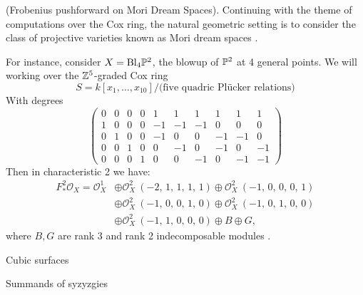 \documentclass{article}
\def\O{\mathcal O}
\numberwithin{equation}{section}
\theoremstyle{theorem}
\numberwithin{thm}{section}
\theoremstyle{definition}
\begin{document}
\begin{exa}(Frobenius pushforward on Mori Dream Spaces).
  Continuing with the theme of computations over the Cox ring, the natural geometric setting is to consider the class of projective varieties known as Mori dream spaces \cite{HuKeel00}.

  For instance, consider $X = \mathrm{Bl}_4\P^2$, the blowup of $\P^2$ at 4 general points. We will working over the $\Z^5$-graded Cox ring
  \[ S = k[x_1,\dots,x_{10}]/\text{(five quadric Pl\"ucker relations)} \]
  With degrees
    \[
    \left(\!\begin{array}{cccccccccc}
      0&0&0&0&1&1&1&1&1&1 \\
      1&0&0&0&-1&-1&-1&0&0&0 \\
      0&1&0&0&-1&0&0&-1&-1&0 \\
      0&0&1&0&0&-1&0&-1&0&-1 \\
      0&0&0&1&0&0&-1&0&-1&-1
    \end{array}\!\right)
    \]
    Then in characteristic 2 we have:
    \begin{align*}
      F_*^2\O_X = {\O_{X}^{1}}
      &\oplus {\O_{X}^{2}\ \left(-2,\,1,\,1,\,1,\,1\right)} \oplus {\O_{X}^{2}\ \left(-1,\,0,\,0,\,0,\,1\right)} \\
      &\oplus {\O_{X}^{2}\ \left(-1,\,0,\,0,\,1,\,0\right)} \oplus {\O_{X}^{2}\ \left(-1,\,0,\,1,\,0,\,0\right)} \\
      &\oplus {\O_{X}^{2}\ \left(-1,\,1,\,0,\,0,\,0\right)} \oplus B \oplus G,
    \end{align*}
    where $B, G$ are rank 3 and rank 2 indecomposable modules \cite{Hara15}.
\end{exa}

\begin{exa}
Cubic surfaces
\end{exa}

\begin{exa}
Summands of syzyzgies
\end{exa}
\end{document}
